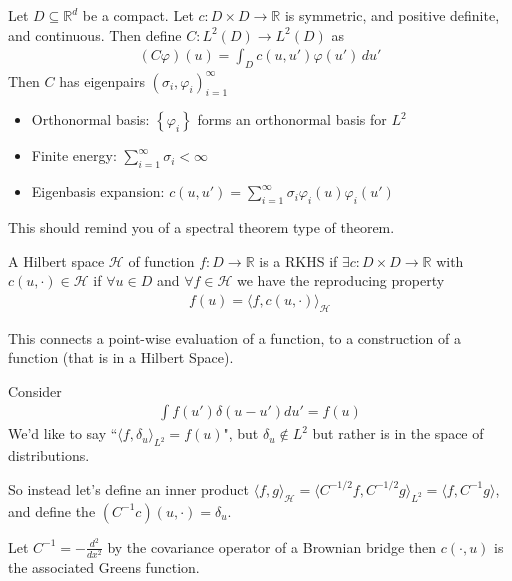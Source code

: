 \documentclass[11pt,fleqn]{article}
\numberwithin{equation}{section}
\theoremstyle{definition}
\theoremstyle{definition}
\begin{document}
\begin{theorem}
	[Mercer] Let $D \subseteq \mathbb R^d$ be a compact. Let $c: D \times D \to \mathbb R$ is symmetric, and positive definite, and continuous. Then define $C : L^2(D) \to L^2 (D)$ as
	\begin{align}
		(C \varphi)(u) = \int_D c(u,u') \varphi(u') \, du'
	\end{align}
	Then $C$ has eigenpairs $(\sigma_i, \varphi_i)_{i=1}^\infty$
	\begin{itemize}
		\item Orthonormal basis: $\left\{ \varphi_i \right\}$ forms an orthonormal basis for $L^2$
		\item Finite energy: $\sum_{i=1}^\infty \sigma_i < \infty$
		\item Eigenbasis expansion: $c(u,u') = \sum_{i=1}^\infty \sigma_i \varphi_i(u) \varphi_i(u')$ 
	\end{itemize}
	This should remind you of a spectral theorem type of theorem.
\end{theorem}

\begin{definition}[RKHS]
	A Hilbert space $\mathcal H$ of function $f: D \to \mathbb R$ is a RKHS if $\exists c : D \times D \to \mathbb R$ with $c(u, \cdot) \in \mathcal H$ if $\forall u \in D$ and $\forall f \in \mathcal H$ we have the reproducing property
	\begin{align}
		f(u) = \langle f, c(u, \cdot)\rangle_{\mathcal H}
	\end{align}
\end{definition}
This connects a point-wise evaluation of a function, to a construction of a function (that is in a Hilbert Space).

\begin{eg}
	 Consider
	\begin{align}
		\int f(u') \delta(u-u') du' = f(u)
	\end{align}
	We'd like to say ``$\langle f, \delta_u \rangle_{L^2} = f(u)$", but $\delta_u \notin L^2$ but rather is in the space of distributions. 
\end{eg}
So instead let's define an inner product $\langle f, g \rangle_{\mathcal H} = \langle C^{-1/2} f , C^{-1/2} g\rangle_{L^2} = \langle f, C^{-1} g\rangle$, and define the $(C^{-1} c)(u, \cdot) = \delta_u$. 
\begin{eg}
	Let $C^{-1} = - \frac{d^2}{dx^2}$ by the covariance operator of a Brownian bridge then $c(\cdot, u)$ is the associated Greens function.
\end{eg}
\end{document}
